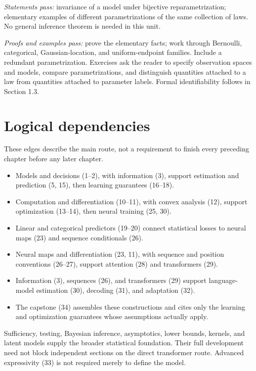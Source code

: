 \documentclass[11pt,oneside]{book}
\begin{document}
\textit{Statements pass:} invariance of a model under bijective
reparametrization; elementary examples of different parametrizations of the
same collection of laws. No general inference theorem is needed in this unit.

\textit{Proofs and examples pass:} prove the elementary facts; work through
Bernoulli, categorical, Gaussian-location, and uniform-endpoint families.
Include a redundant parametrization. Exercises ask the reader to specify
observation spaces and models, compare parametrizations, and distinguish
quantities attached to a law from quantities attached to parameter labels.
Formal identifiability follows in Section 1.3.

\section*{Logical dependencies}
These edges describe the main route, not a requirement to finish every preceding
chapter before any later chapter.
\begin{itemize}
\item Models and decisions (1--2), with information (3), support estimation
and prediction (5, 15), then learning guarantees (16--18).
\item Computation and differentiation (10--11), with convex analysis (12),
support optimization (13--14), then neural training (25, 30).
\item Linear and categorical predictors (19--20) connect statistical losses
to neural maps (23) and sequence conditionals (26).
\item Neural maps and differentiation (23, 11), with sequence and position
conventions (26--27), support attention (28) and transformers (29).
\item Information (3), sequences (26), and transformers (29) support
language-model estimation (30), decoding (31), and adaptation (32).
\item The capstone (34) assembles these constructions and cites only the
learning and optimization guarantees whose assumptions actually apply.
\end{itemize}
Sufficiency, testing, Bayesian inference, asymptotics, lower bounds, kernels,
and latent models supply the broader statistical foundation. Their full
development need not block independent sections on the direct transformer route.
Advanced expressivity (33) is not required merely to define the model.
\end{document}
